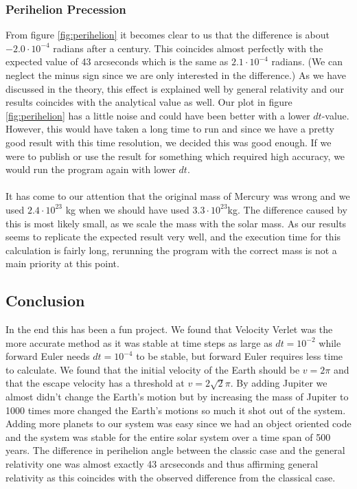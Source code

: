 \documentclass{article}
\newcommand{\E}[1]{\cdot 10^{#1}}
\begin{document}
\subsubsection{Perihelion Precession}
From figure \ref{fig:perihelion} it becomes clear to us that the difference is about $-2.0\E{-4}$ radians after a century. This coincides almost perfectly with the expected value of 43 arcseconds which is the same as $2.1\E{-4}$ radians. (We can neglect the minus sign since we are only interested in the difference.) As we have discussed in the theory, this effect is explained well by general relativity and our results coincides with the analytical value as well. Our plot in figure \ref{fig:perihelion} has a little noise and could have been better with a lower $dt$-value. However, this would have taken a long time to run and since we have a pretty good result with this time resolution, we decided this was good enough. If we were to publish or use the result for something which required high accuracy, we would run the program again with lower $dt$. \\ \\
It has come to our attention that the original mass of Mercury was wrong and we used $2.4\E{23}$ kg when we should have used $3.3 \E{23}$kg. The difference caused by this is most likely small, as we scale the mass with the solar mass. As our results seems to replicate the expected result very well, and the execution time for this calculation is fairly long, rerunning the program with the correct mass is not a main priority at this point. %
\subsection{Conclusion}
In the end this has been a fun project. We found that Velocity Verlet was the more accurate method as it was stable at time steps as large as $dt = 10^{-2}$ while forward Euler needs $dt = 10^{-4}$ to be stable, but forward Euler requires less time to calculate. We found that the initial velocity of the Earth should be $v = 2\pi$ and that the escape velocity has a threshold at $v = 2\sqrt{2}\pi$. By adding Jupiter we almost didn't change the Earth's motion but by increasing the mass of Jupiter to 1000 times more changed the Earth's motions so much it shot out of the system. Adding more planets to our system was easy since we had an object oriented code and the system was stable for the entire solar system over a time span of 500 years. The difference in perihelion angle between the classic case and the general relativity one was almost exactly 43 arcseconds and thus affirming general relativity as this coincides with the observed difference from the classical case. %

\end{document}
